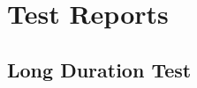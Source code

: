 \section{Test Reports} \label{Test Reports}

\subsection{Long Duration Test} \label{Long Duration Test}
\enlargethispage{2.5cm}
\begin{adjustwidth}{-0.23cm}{0cm} \hfuzz=7.0pt \vfuzz=19.0pt
\end{adjustwidth}
\newpage

